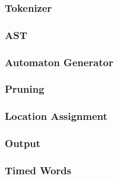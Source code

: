 \subsubsection{Tokenizer}

\subsubsection{AST}

\subsubsection{Automaton Generator}

\subsubsection{Pruning}

\subsubsection{Location Assignment}

\subsubsection{Output}

\subsubsection{Timed Words}
